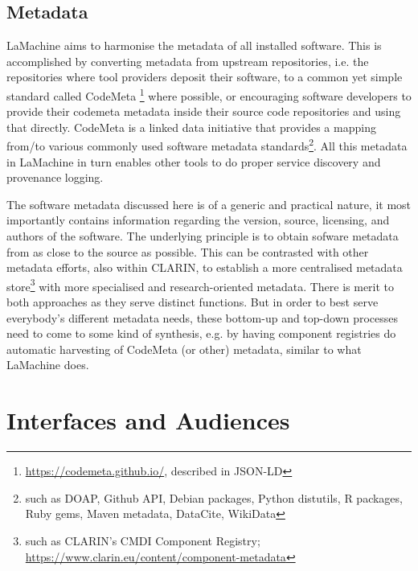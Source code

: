 \documentclass[a4paper,11pt]{article}
\begin{document}
\subsection{Metadata}
\label{sec:metadata}

LaMachine aims to harmonise the metadata of all installed software. This is accomplished by converting metadata from upstream repositories,
i.e. the repositories where tool providers deposit their software, to a common yet simple standard called CodeMeta
\footnote{\url{https://codemeta.github.io/}, described in JSON-LD} \cite{codemeta,codemetar} where possible, or
encouraging software developers to provide their codemeta metadata inside their source code repositories and using that
directly. CodeMeta is a linked data initiative that provides a mapping from/to various commonly used software metadata
standards\footnote{such as DOAP, Github API, Debian packages, Python distutils, R packages, Ruby gems, Maven metadata, DataCite, WikiData}.
All this metadata in LaMachine in turn enables other tools to do proper service discovery and provenance logging.

The software metadata discussed here is of a generic and practical nature, it most importantly contains information regarding the version, source,
licensing, and authors of the software. The underlying principle is to obtain sofware metadata from as close to the
source as possible. This can be contrasted with other metadata efforts, also within CLARIN, to establish a more
centralised metadata store\footnote{such as CLARIN's CMDI Component Registry;
\url{https://www.clarin.eu/content/component-metadata}} with more specialised and
research-oriented metadata. There is merit to both approaches as they serve distinct functions. But in order to best
serve everybody's different metadata needs, these bottom-up and top-down processes need to come to some kind of
synthesis, e.g. by having component registries do automatic harvesting of CodeMeta (or other) metadata, similar to what LaMachine
does.

\FloatBarrier



\section{Interfaces and Audiences}
\end{document}
